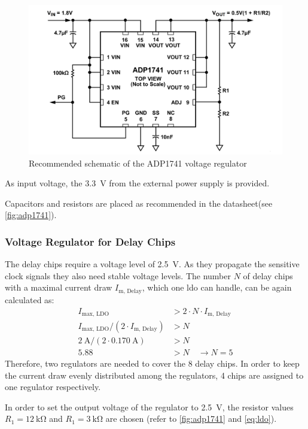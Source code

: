 \begin{figure}[tbh]
	\centering
	\includegraphics[width = \textwidth]{chap/04-theresa/img/schematic/adp1741_d}
	\caption{Recommended schematic of the ADP1741 voltage regulator \cite{adp1741}}
	\label{fig:adp1741}
\end{figure}

As input voltage, the \SI{3.3}{\volt} from the external power supply is provided. 

Capacitors and resistors are placed as recommended in the datasheet\cite{adp1741}(see \autoref{fig:adp1741}).

\subsubsection*{Voltage Regulator for Delay Chips}
The delay chips require a voltage level of \SI{2.5}{\volt}. As they propagate the sensitive clock signals they also need stable voltage levels. 
The number $N$ of delay chips with a maximal current draw $I_\text{m, Delay}$, which one \gls{ldo} can handle, can be again calculated as:
\begin{align*}
	I_\text{max, LDO} &> 2 \cdot N \cdot I_\text{m, Delay} \\
	I_\text{max, LDO}/(2 \cdot I_\text{m, Delay}) &> N \\
	\SI{2}{\ampere} / (2\cdot \SI{0.170}{\ampere}) &> N \\
	5.88 &> N \quad \rightarrow N = 5	
\end{align*}
Therefore, two regulators are needed to cover the 8 delay chips.
In order to keep the current draw evenly distributed among the regulators, 4 chips are assigned to one regulator respectively.

In order to set the output voltage of the regulator to \SI{2.5}{\volt}, the resistor values $R_1 = \SI{12}{\kilo \ohm}$ and $R_1 = \SI{3}{\kilo \ohm}$ are chosen (refer to \autoref{fig:adp1741} and \autoref{eq:ldo}).

